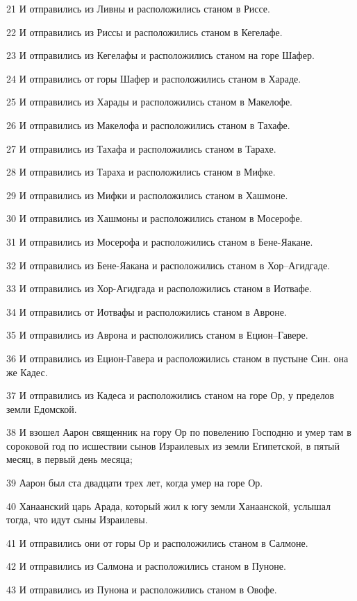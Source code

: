 \par 21 И отправились из Ливны и расположились станом в Риссе.
\par 22 И отправились из Риссы и расположились станом в Кегелафе.
\par 23 И отправились из Кегелафы и расположились станом на горе Шафер.
\par 24 И отправились от горы Шафер и расположились станом в Хараде.
\par 25 И отправились из Харады и расположились станом в Макелофе.
\par 26 И отправились из Макелофа и расположились станом в Тахафе.
\par 27 И отправились из Тахафа и расположились станом в Тарахе.
\par 28 И отправились из Тараха и расположились станом в Мифке.
\par 29 И отправились из Мифки и расположились станом в Хашмоне.
\par 30 И отправились из Хашмоны и расположились станом в Мосерофе.
\par 31 И отправились из Мосерофа и расположились станом в Бене-Яакане.
\par 32 И отправились из Бене-Яакана и расположились станом в Хор--Агидгаде.
\par 33 И отправились из Хор-Агидгада и расположились станом в Иотвафе.
\par 34 И отправились от Иотвафы и расположились станом в Авроне.
\par 35 И отправились из Аврона и расположились станом в Ецион--Гавере.
\par 36 И отправились из Ецион-Гавера и расположились станом в пустыне Син. она же Кадес.
\par 37 И отправились из Кадеса и расположились станом на горе Ор, у пределов земли Едомской.
\par 38 И взошел Аарон священник на гору Ор по повелению Господню и умер там в сороковой год по исшествии сынов Израилевых из земли Египетской, в пятый месяц, в первый день месяца;
\par 39 Аарон был ста двадцати трех лет, когда умер на горе Ор.
\par 40 Ханаанский царь Арада, который жил к югу земли Ханаанской, услышал тогда, что идут сыны Израилевы.
\par 41 И отправились они от горы Ор и расположились станом в Салмоне.
\par 42 И отправились из Салмона и расположились станом в Пуноне.
\par 43 И отправились из Пунона и расположились станом в Овофе.
